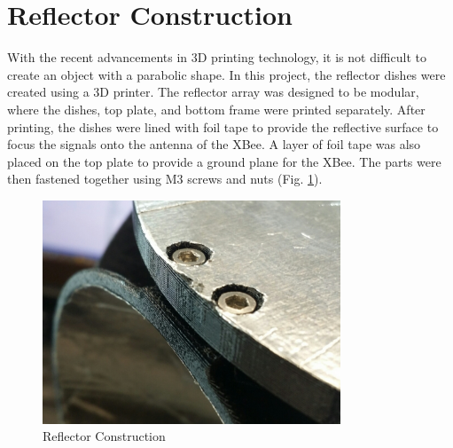 \section{Reflector Construction}
With the recent advancements in 3D printing technology, it is not difficult to
create an object with a parabolic shape. In this project, the reflector dishes
were created using a 3D printer. The reflector array was designed to be modular,
where the dishes, top plate, and bottom frame were printed separately. After
printing, the dishes were lined with foil tape to provide the reflective surface
to focus the signals onto the antenna of the XBee. A layer of foil tape was also
placed on the top plate to provide a ground plane for the XBee. The parts were
then fastened together using M3 screws and nuts (Fig.
\ref{fig:reflectorConstruction}).
%
\begin{figure}
    \centering
    \includegraphics[width=3.5in]{figs/img/reflectorConstruction.jpg}
    \caption{Reflector Construction}
    \label{fig:reflectorConstruction}
\end{figure}



